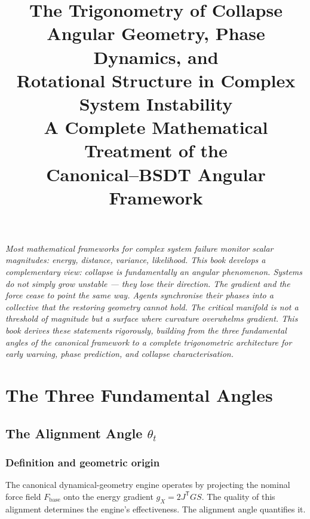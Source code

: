 \documentclass[11pt,a4paper,openany]{book}
\title{
  \Huge\textbf{The Trigonometry of Collapse}\\[0.5em]
  \Large Angular Geometry, Phase Dynamics, and\\
  Rotational Structure in Complex System Instability\\[1em]
  \large A Complete Mathematical Treatment of the\\
  Canonical--BSDT Angular Framework
}
\author{}
\date{}
\theoremstyle{definition}
\newcommand{\T}{^{\mathsf{T}}}
\newcommand{\Fbase}{F_{\mathrm{base}}}
\newcommand{\gX}{g_X}
\begin{document}
\frontmatter
\maketitle

\begin{center}
\vspace{2em}
\begin{minipage}{0.82\textwidth}
\textit{
Most mathematical frameworks for complex system failure monitor scalar magnitudes:
energy, distance, variance, likelihood. This book develops a complementary view:
collapse is fundamentally an angular phenomenon. Systems do not simply grow unstable —
they lose their direction. The gradient and the force cease to point the same way.
Agents synchronise their phases into a collective that the restoring geometry cannot hold.
The critical manifold is not a threshold of magnitude but a surface where curvature
overwhelms gradient. This book derives these statements rigorously, building from
the three fundamental angles of the canonical framework to a complete trigonometric
architecture for early warning, phase prediction, and collapse characterisation.
}
\end{minipage}
\end{center}

\vspace{3em}
\tableofcontents

\mainmatter

\part{The Three Fundamental Angles}

\chapter{The Alignment Angle $\theta_t$}

\section{Definition and geometric origin}

The canonical dynamical-geometry engine operates by projecting the nominal force field
$\Fbase$ onto the energy gradient $\gX = 2J\T GS$. The quality of this alignment
determines the engine's effectiveness. The alignment angle quantifies it.
\end{document}

